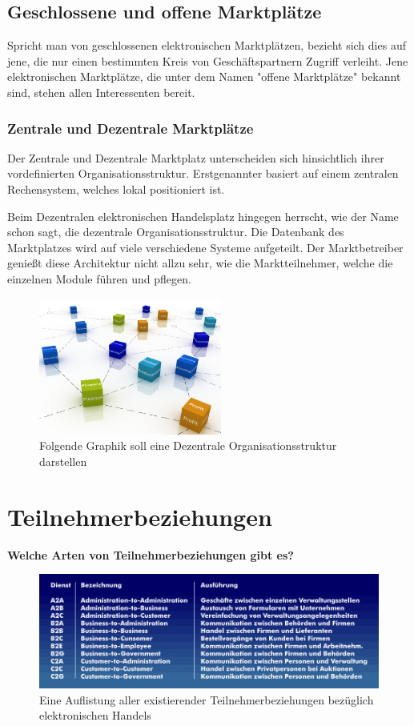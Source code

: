 \documentclass[11pt,a4paper]{article}
\begin{document}
\subsection{Geschlossene und offene Marktplätze}

Spricht man von geschlossenen elektronischen Marktplätzen, bezieht sich dies auf jene, die nur einen bestimmten Kreis von Geschäftspartnern Zugriff verleiht. \newline \newline
Jene elektronischen Marktplätze, die unter dem Namen "offene Marktplätze" bekannt sind, stehen allen Interessenten bereit.
\subsubsection{Zentrale und Dezentrale Marktplätze}

Der Zentrale und Dezentrale Marktplatz unterscheiden sich hinsichtlich ihrer vordefinierten Organisationsstruktur. Erstgenannter basiert auf einem zentralen Rechensystem, welches lokal positioniert ist.

\noindent Beim Dezentralen elektronischen Handelsplatz hingegen herrscht, wie der Name schon sagt, die dezentrale Organisationsstruktur. Die Datenbank des Marktplatzes wird auf viele verschiedene Systeme aufgeteilt. Der Marktbetreiber genießt diese Architektur nicht allzu sehr, wie die Marktteilnehmer, welche die einzelnen Module führen und pflegen. 

\begin{figure}[ht!]
	\centering
	\includegraphics[width=60mm]{filialsteuerung}
	\caption{Folgende Graphik soll eine Dezentrale Organisationsstruktur darstellen \label{filialsteuerung}}
\end{figure}
\newpage
\section{Teilnehmerbeziehungen}
\textbf{Welche Arten von Teilnehmerbeziehungen gibt es?}

\begin{figure}[ht!]
	\centering
	\includegraphics[width=150mm]{teilnehmerbeziehungen}
	\caption{Eine Auflistung aller existierender Teilnehmerbeziehungen bezüglich elektronischen Handels \label{teilnehmerbeziehungen}}
\end{figure}
\end{document}
